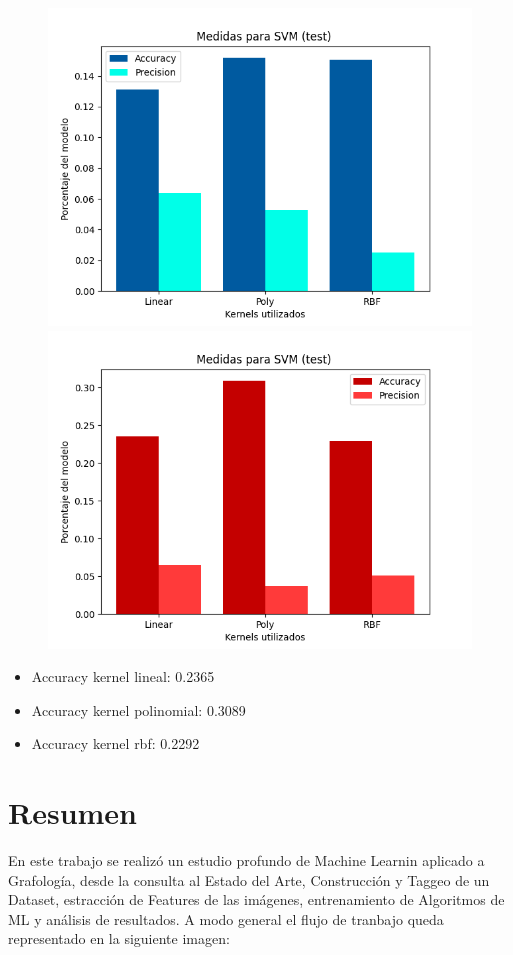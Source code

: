 \documentclass[10pt, a4paper]{article}
\begin{document}
            \begin{figure}[h!]
                \centering
                \includegraphics[width = 0.45\linewidth]{Medias_group.png}
                \includegraphics[width = 0.45\linewidth]{final_gruop.png}

            \end{figure}

            \begin{itemize}
                \item [] Accuracy kernel lineal: 0.2365
                \item [] Accuracy kernel polinomial: 0.3089
                \item [] Accuracy kernel rbf: 0.2292
            \end{itemize}

    \section{Resumen}
        En este trabajo se realiz\'o un estudio profundo de Machine Learnin aplicado a Grafolog\'ia, desde la consulta al Estado del Arte, Construcci\'on y Taggeo de 
        un Dataset, estracci\'on de Features de las im\'agenes, entrenamiento de Algoritmos de ML y an\'alisis de resultados. A modo general el flujo de tranbajo queda representado 
        en la siguiente imagen: 
\end{document}
